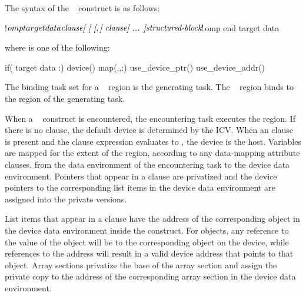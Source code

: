 \begin{fortranspecific}
The syntax of the ~ construct is as follows:

\begin{ompfPragma}
!$omp target data \plc{clause[ [ [},\plc{] clause] ... ]}
    \plc{structured-block}
!$omp end target data
\end{ompfPragma}

where  is one of the following:

\begin{indentedcodelist}
if(\plc{[} target data :\plc{] scalar-logical-expression})
device()
map(\plc{[[map-type-modifier[},\plc{] [map-type-modifier[},\plc{] ...] map-type}:\plc{ ] locator-list})
use_device_ptr()
use_device_addr()
\end{indentedcodelist}

\end{fortranspecific}

\binding
The binding task set for a ~ region is the generating task. 
The ~ region binds to the region of the generating task.

\descr
When a ~ construct is encountered, the encountering task
executes the region. If there is no  clause, the default device is
determined by the  ICV. When an  clause is present 
and the  clause expression evaluates to , the device is the host.
Variables are mapped for the extent of the region, according to any data-mapping 
attribute clauses, from the data environment of the encountering task to the 
device data environment. Pointers that appear in a 
clause are privatized and the device pointers to the corresponding list items
in the device data environment are assigned into the private versions.

List items that appear in a  clause have the address of
the corresponding object in the device data environment inside the construct.
For objects, any reference to the value of the object will be to the
corresponding object on the device, while references to the address will result
in a valid device address that points to that object.
Array sections privatize the base of the array section and assign the private
copy to the address of the corresponding array section in the device data
environment.

